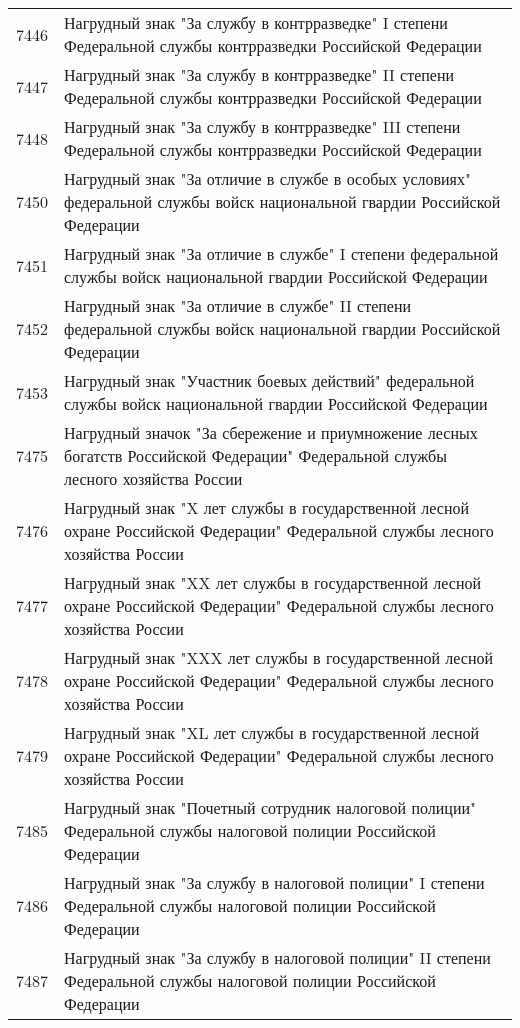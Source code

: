 \documentclass[10pt, a4paper, titlepage]{article}
\begin{document}
\begin{center}
\begin{longtable}{rp{}}
        7446 & Нагрудный знак "За службу в контрразведке" I степени Федеральной службы контрразведки Российской Федерации \\
        7447 & Нагрудный знак "За службу в контрразведке" II степени Федеральной службы контрразведки Российской Федерации \\
        7448 & Нагрудный знак "За службу в контрразведке" III степени Федеральной службы контрразведки Российской Федерации \\
        7450 & Нагрудный знак "За отличие в службе в особых условиях" федеральной службы войск национальной гвардии Российской Федерации \\
        7451 & Нагрудный знак "За отличие в службе" I степени федеральной службы войск национальной гвардии Российской Федерации \\
        7452 & Нагрудный знак "За отличие в службе" II степени федеральной службы войск национальной гвардии Российской Федерации \\
        7453 & Нагрудный знак "Участник боевых действий" федеральной службы войск национальной гвардии Российской Федерации \\
        7475 & Нагрудный значок "За сбережение и приумножение лесных богатств Российской Федерации" Федеральной службы лесного хозяйства России \\
        7476 & Нагрудный знак "X лет службы в государственной лесной охране Российской Федерации" Федеральной службы лесного хозяйства России \\
        7477 & Нагрудный знак "XX лет службы в государственной лесной охране Российской Федерации" Федеральной службы лесного хозяйства России \\
        7478 & Нагрудный знак "XXX лет службы в государственной лесной охране Российской Федерации" Федеральной службы лесного хозяйства России \\
        7479 & Нагрудный знак "XL лет службы в государственной лесной охране Российской Федерации" Федеральной службы лесного хозяйства России \\
        7485 & Нагрудный знак "Почетный сотрудник налоговой полиции" Федеральной службы налоговой полиции Российской Федерации \\
        7486 & Нагрудный знак "За службу в налоговой полиции" I степени Федеральной службы налоговой полиции Российской Федерации \\
        7487 & Нагрудный знак "За службу в налоговой полиции" II степени Федеральной службы налоговой полиции Российской Федерации \\

\end{longtable}
\end{center}
\end{document}
